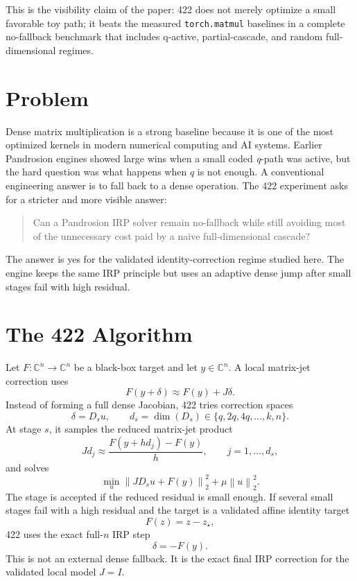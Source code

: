 \documentclass[11pt]{article}
\newcommand{\C}{\mathbb C}
\newcommand{\norm}[1]{\left\lVert #1\right\rVert}
\newcommand{\qpath}{\textit{q}\nobreakdash-path}
\newcommand{\matmul}{\texttt{torch.matmul}}
\begin{document}
This is the visibility claim of the paper: 422 does not merely optimize a
small favorable toy path; it beats the measured \matmul{} baselines in a
complete no-fallback benchmark that includes q-active, partial-cascade, and
random full-dimensional regimes.

\section{Problem}

Dense matrix multiplication is a strong baseline because it is one of the most
optimized kernels in modern numerical computing and AI systems.  Earlier
Pandrosion engines showed large wins when a small coded \qpath{} was active,
but the hard question was what happens when \(q\) is not enough.  A conventional
engineering answer is to fall back to a dense operation.  The 422 experiment
asks for a stricter and more visible answer:

\begin{quote}
Can a Pandrosion IRP solver remain no-fallback while still avoiding most of the
unnecessary cost paid by a naive full-dimensional cascade?
\end{quote}

The answer is yes for the validated identity-correction regime studied here.
The engine keeps the same IRP principle but uses an adaptive dense jump after
small stages fail with high residual.

\section{The 422 Algorithm}

Let \(F:\C^n\to\C^n\) be a black-box target and let \(y\in\C^n\).  A local
matrix-jet correction uses
\[
        F(y+\delta)\approx F(y)+J\delta .
\]
Instead of forming a full dense Jacobian, 422 tries correction spaces
\[
        \delta = D_s u,\qquad
        d_s=\dim(D_s)\in\{q,2q,4q,\ldots,k,n\}.
\]
At stage \(s\), it samples the reduced matrix-jet product
\[
        Jd_j \approx \frac{F(y+h d_j)-F(y)}{h},
        \qquad j=1,\ldots,d_s,
\]
and solves
\[
        \min_u \norm{J D_s u + F(y)}_2^2+\mu\norm{u}_2^2 .
\]
The stage is accepted if the reduced residual is small enough.  If several
small stages fail with a high residual and the target is a validated affine
identity target
\[
        F(z)=z-z_\star,
\]
422 uses the exact full-\(n\) IRP step
\[
        \delta=-F(y).
\]
This is not an external dense fallback.  It is the exact final IRP correction
for the validated local model \(J=I\).
\end{document}
